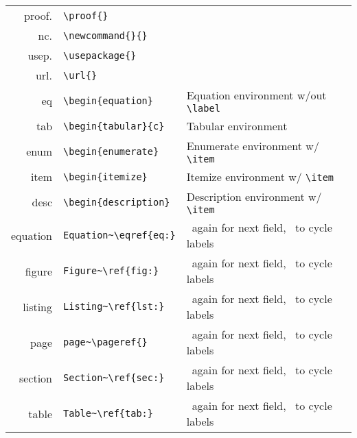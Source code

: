 \documentclass[10pt]{article}
\begin{document}
\begin{table}
\begin{tabular}{r|l|l}
	proof\ctlkey\shiftkey.                          & \verb!\proof{}!                  &                     \\
	nc\ctlkey\shiftkey.                             & \verb!\newcommand{}{}!           &                     \\
	usep\ctlkey\shiftkey.                           & \verb!\usepackage{}!             &                     \\
	url\ctlkey\shiftkey.                            & \verb!\url{}!                    &                     \\
	\hline
	eq\tabkey              & \verb!\begin{equation}!         & Equation environment w/out \verb!\label!  \\
	tab\tabkey             & \verb!\begin{tabular}{c}!       & Tabular environment                       \\
	enum\tabkey            & \verb!\begin{enumerate}!        & Enumerate environment w/ \verb!\item!     \\
	item\tabkey            & \verb!\begin{itemize}!          & Itemize environment w/ \verb!\item!       \\
	desc\tabkey            & \verb!\begin{description}!      & Description environment w/ \verb!\item!   \\
	\hline
	equation\tabkey        & \verb!Equation~\eqref{eq:}!     & \tabkey~again for next field, \esckey~to cycle labels        \\
	figure\tabkey          & \verb!Figure~\ref{fig:}!        & \tabkey~again for next field, \esckey~to cycle labels       \\
	listing\tabkey         & \verb!Listing~\ref{lst:}!       & \tabkey~again for next field, \esckey~to cycle labels       \\
	page\tabkey            & \verb!page~\pageref{}!          & \tabkey~again for next field, \esckey~to cycle labels       \\
	section\tabkey         & \verb!Section~\ref{sec:}!       & \tabkey~again for next field, \esckey~to cycle labels       \\
	table\tabkey           & \verb!Table~\ref{tab:}!         & \tabkey~again for next field, \esckey~to cycle labels       \\
	
	
\end{tabular}
\label{tab:keyboard_shortcuts}
\end{table}
\end{document}
